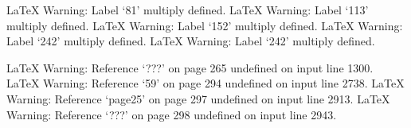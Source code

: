 



LaTeX Warning: Label `81' multiply defined.
LaTeX Warning: Label `113' multiply defined.
LaTeX Warning: Label `152' multiply defined.
LaTeX Warning: Label `242' multiply defined.
LaTeX Warning: Label `242' multiply defined.

LaTeX Warning: Reference `???' on page 265 undefined on input line 1300.
LaTeX Warning: Reference `59' on page 294 undefined on input line 2738.
LaTeX Warning: Reference `page25' on page 297 undefined on input line 2913.
LaTeX Warning: Reference `???' on page 298 undefined on input line 2943.


